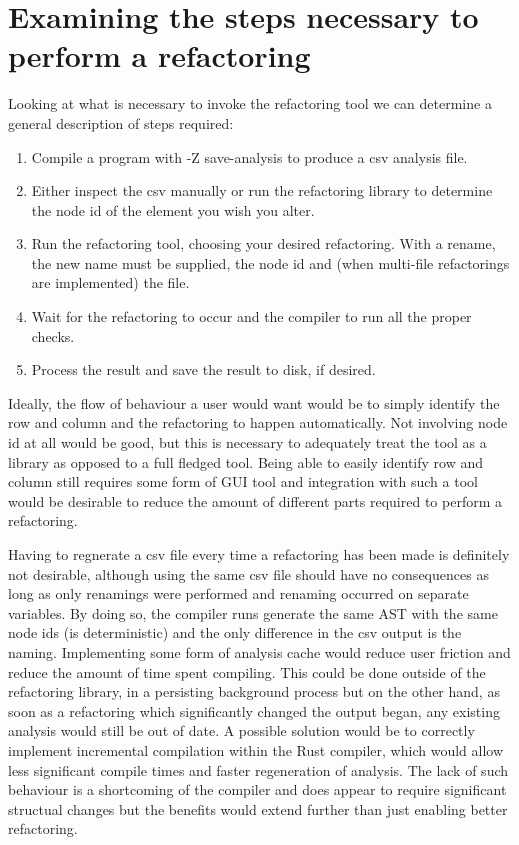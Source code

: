 \section{Examining the steps necessary to perform a refactoring}

Looking at what is necessary to invoke the refactoring tool we can determine a general description of steps required:

\begin{enumerate}
\item Compile a program with -Z save-analysis to produce a csv analysis file.
\item Either inspect the csv manually or run the refactoring library to determine the node id of the element you wish you alter.
\item Run the refactoring tool, choosing your desired refactoring. With a rename, the new name must be supplied, the node id and (when multi-file refactorings are implemented) the file.
\item Wait for the refactoring to occur and the compiler to run all the proper checks. 
\item Process the result and save the result to disk, if desired.
\end{enumerate}

Ideally, the flow of behaviour a user would want would be to simply identify the row and column and the refactoring to happen automatically. Not involving node id at all would be good, but this is necessary to adequately treat the tool as a library as opposed to a full fledged tool. Being able to easily identify row and column still requires some form of GUI tool and integration with such a tool would be desirable to reduce the amount of different parts required to perform a refactoring. 

Having to regnerate a csv file every time a refactoring has been made is definitely not desirable, although using the same csv file should have no consequences as long as only renamings were performed and renaming occurred on separate variables. By doing so, the compiler runs generate the same AST with the same node ids (is deterministic) and the only difference in the csv output is the naming. Implementing some form of analysis cache would reduce user friction and reduce the amount of time spent compiling. This could be done outside of the refactoring library, in a persisting background process but on the other hand, as soon as a refactoring which significantly changed the output began, any existing analysis would still be out of date. A possible solution would be to correctly implement incremental compilation within the Rust compiler, which would allow less significant compile times and faster regeneration of analysis. The lack of such behaviour is a shortcoming of the compiler and does appear to require significant structual changes but the benefits would extend further than just enabling better refactoring.

